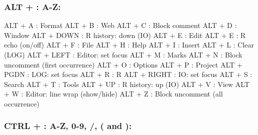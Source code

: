 \subsubsection{ALT + : A-Z:}

\vspace{-0.5cm}
\begin{Rtables}[caption={[ALT keyboard shortcuts]
    ALT Keyboard Shortcuts},
  label=shortcut:alt]
  ALT + A                 : Format
  ALT + B                 : Web
  ALT + C                 : Block comment
  ALT + D                 : Window
  ALT + DOWN              : R history: down (IO)
  ALT + E                 : Edit
  ALT + E                 : R echo (on/off)
  ALT + F                 : File
  ALT + H                 : Help
  ALT + I                 : Insert
  ALT + L                 : Clear (LOG)
  ALT + LEFT              : Editor: set focus
  ALT + M                 : Marks
  ALT + N                 : Block uncomment (first occurrence)
  ALT + O                 : Options
  ALT + P                 : Project
  ALT + PGDN              : LOG: set focus
  ALT + R                 : R
  ALT + RIGHT             : IO: set focus
  ALT + S                 : Search
  ALT + T                 : Tools
  ALT + UP                : R history: up (IO)
  ALT + V                 : View
  ALT + W                 : Editor: line wrap (show/hide)
  ALT + Z                 : Block uncomment (all occurrence)
\end{Rtables}


\newpage
\subsubsection{CTRL + : A-Z, 0-9, /, ( and ):}

